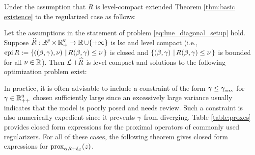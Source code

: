 Under the assumption that $R$ is level-compact \cite{aravkin2022jimtheory} extended Theorem \ref{thm:basic existence} to the regularized case as follows:

\begin{theorem}

\label{thm:basic existence2}
Let the assumptions in the statement of problem \eqref{eq:lme_diagonal_setup} hold.
Suppose ${\widehat R}:\operatorname{\mathbb{R}}^p\times\operatorname{\mathbb{R}}^q_+\rightarrow \operatorname{\mathbb{R}}\cup\{+\infty\}$ 
is lsc and level compact (i.e., $\operatorname{epi}{R}:=\left\{((\beta,\gamma),\nu)\,\left|\,R(\beta,\gamma)\le\nu\right.\right\}$ is closed
and $\left\{(\beta,\gamma)\,\left|\,R(\beta,\gamma)\le\nu\right.\right\}$ is bounded for all $\nu\in\operatorname{\mathbb{R}}$).
Then $\operatorname{\mathcal{L}}+{\widehat R}$ is level compact and solutions to
the following optimization problem exist:
\end{theorem}

In practice, it is often advisable to include a constraint of the form 
$\gamma\le{\gamma_{\mbox{\tiny max}}}$ for $\gamma\in\operatorname{\mathbb{R}}^q_{++}$ chosen
sufficiently large since an excessively large variance usually indicates 
that the model is poorly posed and needs review. 
Such a constraint is also numerically expedient since it prevents $\gamma$ from diverging. Table \ref{table:proxes} provides closed form expressions for the proximal operators 
of commonly used regularizers. 
For all of these cases,  the following theorem gives closed form expressions for
${\mathrm{prox}}_{\alpha R + \delta_{\mathcal{C}}}(z)$.

